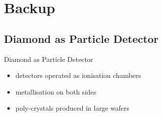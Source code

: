 \section{Backup}
\subsection{Diamond as Particle Detector}
\begin{frame}[noframenumbering]{Diamond as Particle Detector}

	
	\begin{itemize}\itemfill
		\item detectors operated as ionisation chambers 
		\item metallisation on both sides
		\item poly-crystals produced in large wafers
	\end{itemize}

\end{frame}
